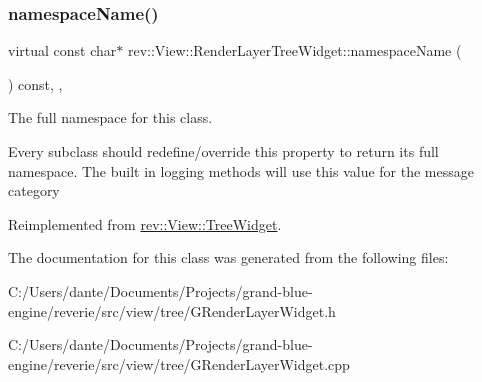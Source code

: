 \mbox{\label{classrev_1_1_view_1_1_render_layer_tree_widget_abf815dc334dc567b1d9defe2ed24efc6}} 
\subsubsection{\texorpdfstring{namespaceName()}{namespaceName()}}
{\footnotesize\ttfamily virtual const char$\ast$ rev\+::\+View\+::\+Render\+Layer\+Tree\+Widget\+::namespace\+Name (\begin{DoxyParamCaption}{ }\end{DoxyParamCaption}) const\hspace{0.3cm}{\ttfamily [inline]}, {\ttfamily [override]}, {\ttfamily [virtual]}}



The full namespace for this class. 

Every subclass should redefine/override this property to return its full namespace. The built in logging methods will use this value for the message category 

Reimplemented from \mbox{\hyperlink{classrev_1_1_view_1_1_tree_widget_a09be824e34e50e9622c3dc333c9a3c07}{rev\+::\+View\+::\+Tree\+Widget}}.



The documentation for this class was generated from the following files\+:\begin{DoxyCompactItemize}
\item 
C\+:/\+Users/dante/\+Documents/\+Projects/grand-\/blue-\/engine/reverie/src/view/tree/G\+Render\+Layer\+Widget.\+h\item 
C\+:/\+Users/dante/\+Documents/\+Projects/grand-\/blue-\/engine/reverie/src/view/tree/G\+Render\+Layer\+Widget.\+cpp\end{DoxyCompactItemize}
